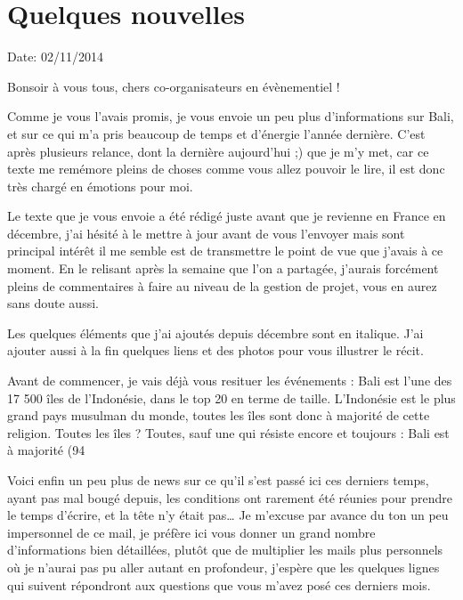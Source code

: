 \section{Quelques nouvelles}

Date: 02/11/2014

\begin{multicols}{2}

Bonsoir à vous tous, chers co-organisateurs en évènementiel !

Comme je vous l’avais promis, je vous envoie un peu plus d’informations sur Bali, et sur ce qui m’a pris beaucoup de temps et d’énergie l’année dernière. C’est après plusieurs relance, dont la dernière aujourd’hui ;) que je m’y met, car ce texte me remémore pleins de choses comme vous allez pouvoir le lire, il est donc très chargé en émotions pour moi.

Le texte que je vous envoie a été rédigé juste avant que je revienne en France en décembre, j’ai hésité à le mettre à jour avant de vous l'envoyer mais sont principal intérêt il me semble est de transmettre le point de vue que j’avais à ce moment. En le relisant après la semaine que l’on a partagée, j’aurais forcément pleins de commentaires à faire au niveau de la gestion de projet, vous en aurez sans doute aussi.

Les quelques éléments que j’ai ajoutés depuis décembre sont en italique. J’ai ajouter aussi à la fin quelques liens et des photos pour vous illustrer le récit.

Avant de commencer, je vais déjà vous resituer les événements : Bali est l’une des 17 500 îles de l’Indonésie, dans le top 20 en terme de taille. L’Indonésie est le plus grand pays musulman du monde, toutes les îles sont donc à majorité de cette religion. Toutes les îles ? Toutes, sauf une qui résiste encore et toujours : Bali est à majorité (94%

Voici enfin un peu plus de news sur ce qu’il s’est passé ici ces derniers temps, ayant pas mal bougé depuis, les conditions ont rarement été réunies pour prendre le temps d’écrire, et la tête n’y était pas… Je m’excuse par avance du ton un peu impersonnel de ce mail, je préfère ici vous donner un grand nombre d’informations bien détaillées, plutôt que de multiplier les mails plus personnels où je n’aurai pas pu aller autant en profondeur, j’espère que les quelques lignes qui suivent répondront aux questions que vous m’avez posé ces derniers mois.


\end{multicols}
